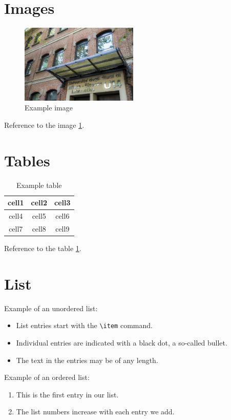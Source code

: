 \documentclass[a4paper, oneside]{book}
\begin{document}
\section{Images}


\begin{figure}[H]
\centering
\includegraphics[width=0.5\textwidth]{u14.jpg}
\caption{Example image}
\label{img:ref_image}
\end{figure}

Reference to the image \ref{img:ref_image}.

\section{Tables}
\begin{table}
\centering
\begin{tabular}{|c|c|c|} 
 \hline
 cell1 & cell2 & cell3 \\ \hline
 cell4 & cell5 & cell6 \\ \hline
 cell7 & cell8 & cell9 \\ \hline
\end{tabular}
\caption{Example table}
\label{tab:ref_table}
\end{table}

Reference to the table \ref{tab:ref_table}.

\section{List}
Example of an unordered list:
\begin{itemize}
  \item List entries start with the \verb|\item| command.
  \item Individual entries are indicated with a black dot, a so-called bullet.
  \item The text in the entries may be of any length.
\end{itemize}

Example of an ordered list:
\begin{enumerate}
  \item This is the first entry in our list.
  \item The list numbers increase with each entry we add.
\end{enumerate}
\end{document}
